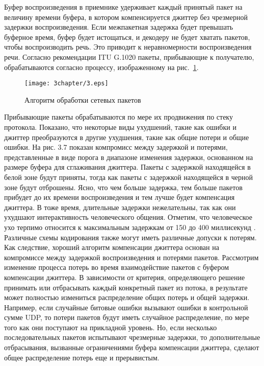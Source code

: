 Буфер воспроизведения в приемнике удерживает каждый принятый пакет на величину времени буфера, в котором компенсируется джиттер без чрезмерной задержки воспроизведения. Если межпакетная задержка будет превышать буферное время, буфер будет истощаться, и декодеру не будет хватать пакетов, чтобы воспроизводить речь. Это приводит к неравномерности воспроизведения речи. 
Согласно рекомендации ITU G.1020 \cite{G1020} пакеты, прибывающие к получателю, обрабатываются согласно процессу, изображенному на рис. \ref{img3:algh_pack}.

\begin{figure} [h]
  \center
\texttt{[image: 3chapter/3.eps]}
  \caption{Алгоритм обработки сетевых пакетов}
  \label{img3:algh_pack}
\end{figure}

Прибывающие пакеты обрабатываются по мере их продвижения по стеку протокола. Показано, что некоторые виды ухудшений, такие как ошибки и джиттер преобразуются в другие ухудшения, такие как общие потери и общие ошибки.
На рис. 3.7 показан компромисс между задержкой и потерями, представленные в виде порога в диапазоне изменения задержки, основанном на размере буфера для сглаживания джиттера. Пакеты с задержкой находящейся в белой зоне будут приняты, тогда как пакеты с задержкой находящейся в черной зоне будут отброшены. Ясно, что чем больше задержка, тем больше пакетов прибудет до их времени воспроизведения и тем лучше будет компенсация джиттера. В тоже время, длительные задержки нежелательны, так как они ухудшают интерактивность человеческого общения. Отметим, что человеческое ухо терпимо относится к максимальным задержкам от 150 до 400 миллисекунд \cite{Moon}. Различные схемы кодирования также могут иметь различные допуски к потерям. Как следствие, хороший алгоритм компенсации джиттера основан на компромиссе между задержкой воспроизведения и потерями пакетов.
Рассмотрим изменение процесса потерь во время взаимодействие пакетов с буфером компенсации джиттера. В зависимости от критерия, определяющего решение принимать или отбрасывать каждый конкретный пакет из потока, в результате может полностью измениться распределение общих потерь и общей задержки. Например, если случайные битовые ошибки вызывают ошибки в контрольной сумме UDP, то потери пакетов будут иметь случайное распределение, по мере того как они поступают на прикладной уровень. Но, если несколько последовательных пакетов испытывают чрезмерные задержки, то дополнительные отбрасывания, вызванные ограничениями буфера компенсации джиттера, сделают общее распределение потерь еще и прерывистым.
